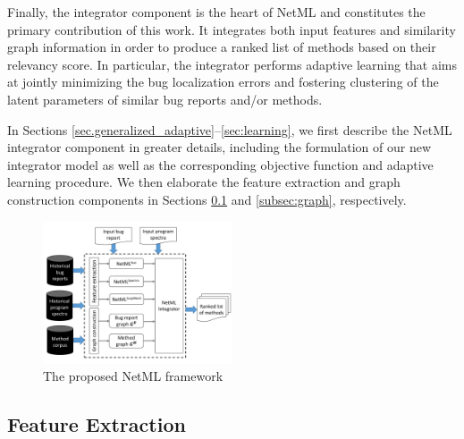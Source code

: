 Finally, the integrator component is the heart of NetML and constitutes the primary contribution of this work. It integrates both input features and similarity graph information in order to produce a ranked list of methods based on their relevancy score. In particular, the integrator performs adaptive learning that aims at jointly minimizing the bug localization errors and fostering clustering of the latent parameters of similar bug reports and/or methods.

In Sections \ref{sec.generalized_adaptive}--\ref{sec:learning}, we first describe the NetML integrator component in greater details, including the formulation of our new integrator model as well as the corresponding objective function and adaptive learning procedure. We then elaborate the feature extraction and graph construction components in Sections \ref{subsec:feature} and \ref{subsec:graph}, respectively.


\begin{figure}[!t]
\centering
\includegraphics[width=0.5\textwidth]{netml_framework}
\caption{The proposed NetML framework}
\label{fig:framework}
\end{figure}

\subsection{Feature Extraction}
\label{subsec:feature}


